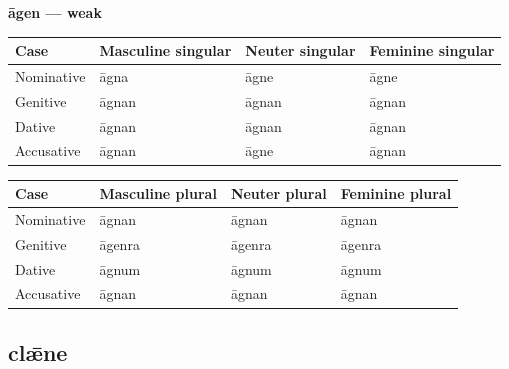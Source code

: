 \textbf{āgen — weak}

\par\begingroup
\fontsize{10.5}{13.2}\selectfont
\setlength{\LTleft}{0pt}\setlength{\LTright}{\fill}
\noindent
\begin{tabular}{@{}>{\raggedright\arraybackslash}p{22.0mm}>{\raggedright\arraybackslash}p{31.188mm}>{\raggedright\arraybackslash}p{31.188mm}>{\raggedright\arraybackslash}p{31.188mm}@{}}
\toprule
\textbf{Case} & \textbf{Masculine singular} & \textbf{Neuter singular} & \textbf{Feminine singular} \\
\midrule
Nominative & āgna & āgne & āgne \\
Genitive & āgnan & āgnan & āgnan \\
Dative & āgnan & āgnan & āgnan \\
Accusative & āgnan & āgne & āgnan \\
\bottomrule
\end{tabular}
\par\endgroup
\par\addvspace{5pt}
\par\begingroup
\fontsize{10.5}{13.2}\selectfont
\setlength{\LTleft}{0pt}\setlength{\LTright}{\fill}
\noindent
\begin{tabular}{@{}>{\raggedright\arraybackslash}p{22.0mm}>{\raggedright\arraybackslash}p{31.188mm}>{\raggedright\arraybackslash}p{31.188mm}>{\raggedright\arraybackslash}p{31.188mm}@{}}
\toprule
\textbf{Case} & \textbf{Masculine plural} & \textbf{Neuter plural} & \textbf{Feminine plural} \\
\midrule
Nominative & āgnan & āgnan & āgnan \\
Genitive & āgenra & āgenra & āgenra \\
Dative & āgnum & āgnum & āgnum \\
Accusative & āgnan & āgnan & āgnan \\
\bottomrule
\end{tabular}
\par\endgroup

\subsection*{clǣne}

